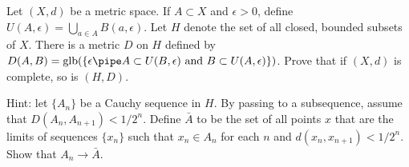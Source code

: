 Let $(X,d)$ be a metric space. If $A\subset X$ and $\epsilon>0$,
define $U(A,\epsilon)=\bigcup_{a\in A}B(a,\epsilon)$. Let $H$ denote
the set of all closed, bounded subsets of $X$. There is a metric $D$
on $H$ defined by $D(A,B)=\mathrm{glb}(\{\epsilon\pipe A\subset
U(B,\epsilon) \text{\ and\ } B\subset U(A,\epsilon)\})$. Prove that if
$(X,d)$ is complete, so is $(H,D)$.

Hint: let $\{A_n\}$ be a Cauchy sequence in $H$. By passing to a
subsequence, assume that $D(A_n,A_{n+1})<1/2^n$. Define $\bar{A}$ to
be the set of all points $x$ that are the limits of sequences
$\{x_n\}$ such that $x_n\in A_n$ for each $n$ and
$d(x_n,x_{n+1})<1/2^n$. Show that $A_n\rightarrow
\bar{A}$.
